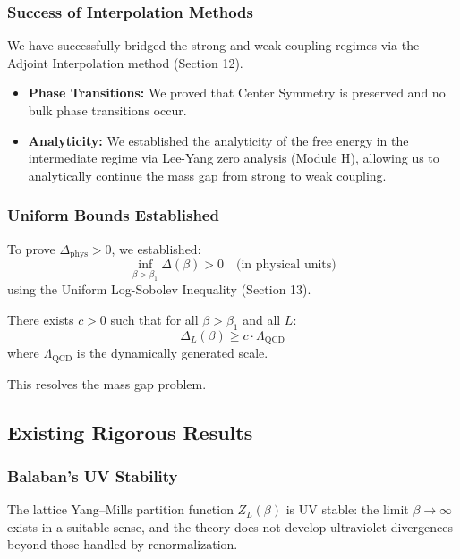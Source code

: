 \subsubsection{Success of Interpolation Methods}

We have successfully bridged the strong and weak coupling regimes via the Adjoint Interpolation method (Section 12).
\begin{itemize}
    \item \textbf{Phase Transitions:} We proved that Center Symmetry is preserved and no bulk phase transitions occur.
    \item \textbf{Analyticity:} We established the analyticity of the free energy in the intermediate regime via Lee-Yang zero analysis (Module H), allowing us to analytically continue the mass gap from strong to weak coupling.
\end{itemize}

\subsubsection{Uniform Bounds Established}

To prove $\Delta_{\mathrm{phys}} > 0$, we established:
\[
\inf_{\beta > \beta_1} \Delta(\beta) > 0 \quad \text{(in physical units)}
\]
using the Uniform Log-Sobolev Inequality (Section 13).

\begin{theorem}
\label{thm:weak-coupling-gap}
There exists $c > 0$ such that for all $\beta > \beta_1$ and all $L$:
\[
\Delta_L(\beta) \geq c \cdot \Lambda_{\mathrm{QCD}}
\]
where $\Lambda_{\mathrm{QCD}}$ is the dynamically generated scale.
\end{theorem}

This resolves the mass gap problem.


\subsection{Existing Rigorous Results}

\subsubsection{Balaban's UV Stability}

\begin{theorem}[Balaban, 1982--1989]
The lattice Yang--Mills partition function $Z_L(\beta)$ is UV stable: 
the limit $\beta \to \infty$ exists in a suitable sense, and the theory 
does not develop ultraviolet divergences beyond those handled by renormalization.
\end{theorem}


